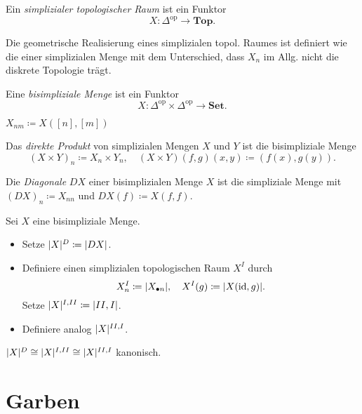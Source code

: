 \documentclass{cheat-sheet}
\newcommand{\SetC}{\mathbf{Set}} %
\newcommand{\Top}{\mathbf{Top}} %
\newcommand{\op}{\mathrm{op}} %
\begin{document}
\begin{defn}
  Ein \emph{simplizialer topologischer Raum} ist ein Funktor
  \[ X : \Delta^\op \to \Top. \]
\end{defn}

\begin{bem}
  Die geometrische Realisierung eines simplizialen topol. Raumes ist definiert wie die einer simplizialen Menge mit dem Unterschied, dass $X_n$ im Allg. nicht die diskrete Topologie trägt.
\end{bem}

\begin{defn}
  Eine \emph{bisimpliziale Menge} ist ein Funktor
  \[ X : \Delta^\op \times \Delta^\op \to \SetC. \]
\end{defn}

\begin{nota}
  $X_{nm} \coloneqq X([n],[m])$
\end{nota}

\begin{bsp}
  Das \emph{direkte Produkt} von simplizialen Mengen $X$ und $Y$ ist die bisimpliziale Menge
  \[
    (X \times Y)_n \coloneqq X_n \times Y_n, \quad
    (X \times Y)(f, g)(x, y) \coloneqq (f(x), g(y)).
  \]
\end{bsp}

\begin{samepage}

\begin{defn}
  Die \emph{Diagonale} $DX$ einer bisimplizialen Menge $X$ ist die simpliziale Menge mit
  $(DX)_n \coloneqq X_{nn}$ und $DX(f) \coloneqq X(f, f)$.
\end{defn}

\begin{defn}
  Sei $X$ eine bisimpliziale Menge.
  \begin{itemize}
    \item Setze $\lvert X\rvert^D \coloneqq \lvert DX\rvert$.
    \item Definiere einen simplizialen topologischen Raum $X^I$ durch
    \[ X^I_n \coloneqq \lvert X_{\bullet n}\rvert, \quad X^I(g) \coloneqq \lvert X(\operatorname{id}, g)\rvert. \]
    Setze $\lvert X\rvert^{I,II} \coloneqq \lvert II,I\rvert$.
    \item Definiere analog $\lvert X\rvert^{II,I}$.
  \end{itemize}
\end{defn}

\begin{satz}
  $\lvert X\rvert^D \cong \lvert X\rvert^{I,II} \cong \lvert X\rvert^{II,I}$ kanonisch.
\end{satz}

\section{Garben}

\end{samepage}
\end{document}
